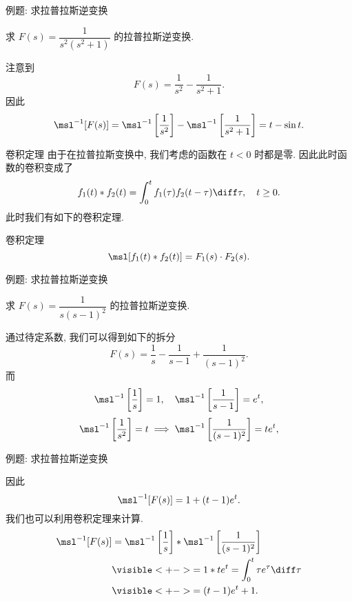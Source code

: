\begin{frame}{例题: 求拉普拉斯逆变换}
\begin{example}
求 $F(s)=\dfrac1{s^2(s^2+1)}$ 的拉普拉斯逆变换.
\end{example}
\begin{solution}
注意到
\[F(s)=\frac1{s^2}-\frac1{s^2+1}.\]
\onslide<+->
因此
\[\msl^{-1}[F(s)]=\msl^{-1}\left[\frac1{s^2}\right]
-\msl^{-1}\left[\frac1{s^2+1}\right]
=t-\sin t.\]
\end{solution}
\end{frame}


\begin{frame}{卷积定理}
\onslide<+->
由于在拉普拉斯变换中, 我们考虑的函数在 $t<0$ 时都是零.
\onslide<+->
因此此时函数的卷积变成了
\[f_1(t)\ast f_2(t)=\int_0^t f_1(\tau)f_2(t-\tau)\diff \tau,\quad t\ge 0.\]
\onslide<+->
此时我们有如下的卷积定理.
\begin{block}{卷积定理}
\[\msl[f_1(t)\ast f_2(t)]=F_1(s)\cdot F_2(s).\]
\end{block}
\end{frame}


\begin{frame}{例题: 求拉普拉斯逆变换}
\beqskip{6pt}
\begin{example}
求 $F(s)=\dfrac1{s(s-1)^2}$ 的拉普拉斯逆变换.
\end{example}
\begin{solution}
通过待定系数, 我们可以得到如下的拆分
\[F(s)=\frac1s-\frac1{s-1}+\frac1{(s-1)^2}.\]
\onslide<+->
而
\[\msl^{-1}\left[\frac1s\right]=1,\quad \msl^{-1}\left[\frac1{s-1}\right]=e^t,\]
\onslide<+->
\[\msl^{-1}\left[\frac1{s^2}\right]=t\implies\msl^{-1}\left[\frac1{(s-1)^2}\right]=te^t,\]
\end{solution}
\endgroup
\end{frame}


\begin{frame}{例题: 求拉普拉斯逆变换}
\begin{solutionc}
因此
\[\msl^{-1}[F(s)]=1+(t-1)e^t.\]
\onslide<+->
我们也可以利用卷积定理来计算.
\onslide<+->
\begin{align*}
\msl^{-1}[F(s)]&=\msl^{-1}\left[\frac1s\right]\ast\msl^{-1}\left[\frac1{(s-1)^2}\right]\\
&\visible<+->{=1\ast te^t=\int_0^t\tau e^\tau\diff \tau}\\
&\visible<+->{=(t-1)e^t+1.}
\end{align*}
\end{solutionc}
\end{frame}


